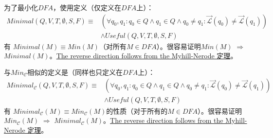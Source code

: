 \begin{property}
    为了最小化$DFA$，使用定义（仅定义在$DFA$上）：
    \begin{align*}
        Minimal(Q,V,T,\emptyset,S,F)  \equiv & ( \forall q_0,q_1:q_0 \in Q \land q_1 \in Q \land q_0 \not= q_1 : \overrightarrow{\mathcal{L}}(q_0) \not= \overrightarrow{\mathcal{L}}(q_1)  ) \\
                                     & \land Useful(Q,V,T,\emptyset,S,F)
        \end{align*}
有 $Minimal(M) \equiv Min(M)$（对所有$M\in DFA$）。很容易证明$Min(M)$ $\Rightarrow$ $Minimal(M)$。\uline{The reverse direction follows from the Myhill-Nerode 定理}。

与$Min_{\mathcal{C}}$相似的定义是（同样也只定义在$DFA$上）：
    \begin{align*}
        Minimal_{\mathcal{C}}(Q,V,T,\emptyset,S,F)  \equiv & ( \forall q_0,q_1:q_0 \in Q \land q_1 \in Q \land q_0 \not= q_1 : \overrightarrow{\mathcal{L}}(q_0) \not= \overrightarrow{\mathcal{L}}(q_1)  ) \\
                                 & \land Useful(Q,V,T,\emptyset,S,F)
    \end{align*}
有 $Minimal_{\mathcal{C}}(M) \equiv Min_{\mathcal{C}}(M)$的性质（对于所有的$M\in DFA$）。很容易证明$Min_{\mathcal{C}}(M)$ $\Rightarrow$ $Minimal_{\mathcal{C}}(M)$。\uline{The reverse direction follows from the Myhill-Nerode 定理}。
\end{property}


